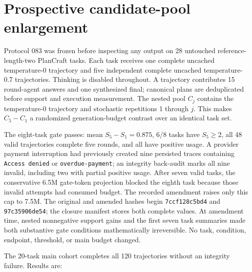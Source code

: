 \section{Prospective candidate-pool enlargement}
\label{app:pool}

Protocol 083 was frozen before inspecting any output on 28 untouched reference-length-two PlanCraft tasks. Each task receives one complete uncached temperature-0 trajectory and five independent complete uncached temperature-0.7 trajectories. Thinking is disabled throughout. A trajectory contributes 15 round-agent answers and one synthesized final; canonical plans are deduplicated before support and execution measurement. The nested pool \(C_j\) contains the temperature-0 trajectory and stochastic repetitions 1 through \(j\). This makes \(C_5-C_1\) a randomized generation-budget contrast over an identical task set.

The eight-task gate passes: mean \(S_5-S_1=0.875\), 6/8 tasks have \(S_5\ge2\), all 48 valid trajectories complete five rounds, and all have positive usage. A provider payment interruption had previously created nine persisted traces containing \texttt{Access denied} or \texttt{overdue-payment}; an integrity back-audit marks all nine invalid, including two with partial positive usage. After seven valid tasks, the conservative 6.5M gate-token projection blocked the eighth task because those invalid attempts had consumed budget. The recorded amendment raises only this cap to 7.5M. The original and amended hashes begin \texttt{7ccf128c5bd4} and \texttt{97c35906de54}; the closure manifest stores both complete values. At amendment time, nested nonnegative support gains and the first seven task summaries made both substantive gate conditions mathematically irreversible. No task, condition, endpoint, threshold, or main budget changed.

The 20-task main cohort completes all 120 trajectories without an integrity failure. Results are:

\begin{center}
\end{center}

